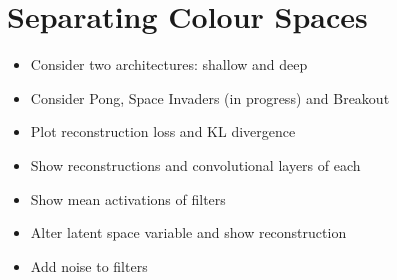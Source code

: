 \clearpage
%
%
%
%
%
\section{Separating Colour Spaces}
\begin{itemize}
\item Consider two architectures: shallow and deep
\item Consider Pong, Space Invaders (in progress) and Breakout
\item Plot reconstruction loss and KL divergence
\item Show reconstructions and convolutional layers of each
\item Show mean activations of filters
\item Alter latent space variable and show reconstruction
\item Add noise to filters
\end{itemize}




